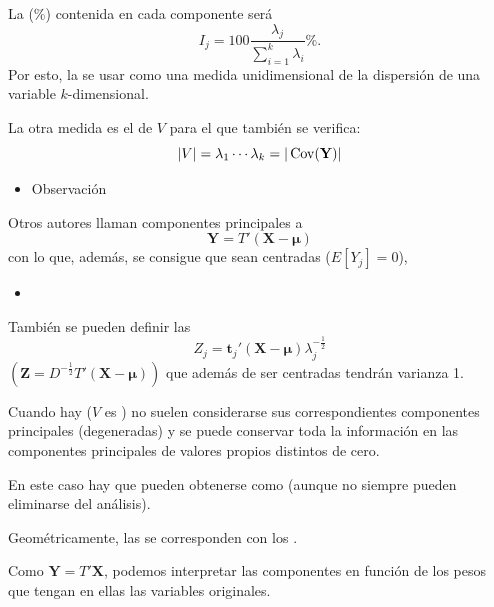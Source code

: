 La  (\%) contenida en cada componente será \[ I_j=100\dfrac{\lambda_j}{\displaystyle\sum_{i=1}^{k}\lambda_i}\%. \]
Por esto, la  se usar como una medida unidimensional de la dispersión de una variable $k$-dimensional.

La otra medida es el  de $V$ para el que también se verifica: \[ |V|=\lambda_1\cdots\lambda_k=|\operatorname{Cov}(\mathbf{Y})| \]
\begin{itemize}[label=\color{red}\textbullet, leftmargin=*]
	\item \color{lightblue}Observación
\end{itemize}
Otros autores llaman componentes principales a \[ \mathbf{Y}=T'(\mathbf{X-\mu}) \] con lo que, además, se consigue que sean centradas ($E[Y_j]=0$),
\begin{itemize}
	\item {}
\end{itemize}
También se pueden definir las  \[ Z_j=\mathbf{t}_j'(\mathbf{X-\mu})\lambda_j^{-\frac{1}{2}} \] $(\mathbf{Z}=D^{-\frac{1}{2}}T'(\mathbf{X-\mu}))$ que además de ser centradas tendrán varianza 1.

Cuando hay  ($V$ es ) no suelen considerarse sus correspondientes componentes principales (degeneradas) y se puede conservar toda la información en las componentes principales de valores propios distintos de cero.

En este caso hay  que pueden obtenerse como  (aunque no siempre pueden eliminarse del análisis).

Geométricamente, las  se corresponden con los .

Como $\mathbf{Y}=T'\mathbf{X}$, podemos interpretar las componentes en función de los pesos que tengan en ellas las variables originales.

